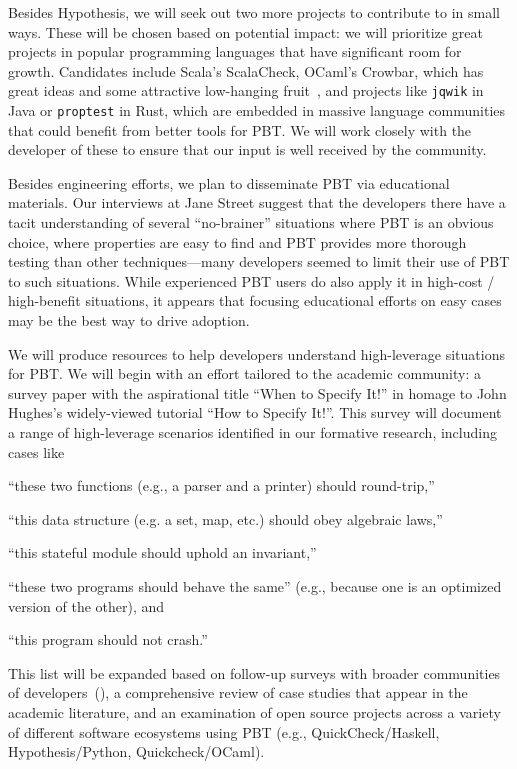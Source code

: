 Besides Hypothesis, we will seek out two more projects to contribute to in small
ways. These
will be chosen based on potential impact: we will prioritize great
projects in popular programming languages that have significant room
for growth. Candidates include
Scala's ScalaCheck,
OCaml's Crowbar, which has great ideas and
some attractive low-hanging fruit~\cite{noauthor_shrinking_nodate}, and projects like
\lstinline{jqwik} in Java or \lstinline{proptest} in Rust, which are
embedded in massive language
communities that could benefit from better tools for PBT.
We will work closely with the
developer of these to ensure that our input is well received by the community.

%
Besides engineering efforts, we plan to disseminate PBT via
educational materials.
Our interviews at Jane Street suggest that the developers there
have a tacit
understanding of several ``no-brainer'' situations where PBT is an obvious
choice, where properties are easy to find and PBT provides
more thorough testing than other techniques---many developers
seemed to limit their use of PBT to such situations.
While experienced PBT users do also apply it in
high-cost / high-benefit situations, it appears that
focusing educational efforts on easy cases may be the best way to
drive adoption.

We will produce resources to help developers understand
high-leverage situations for PBT. We will begin with an effort
tailored to the academic community: a survey paper with the
aspirational title ``When to Specify It!'' in homage to John Hughes's
widely-viewed tutorial ``How to Specify It!''. This survey will
document a  range of high-leverage scenarios identified in our formative
research, including cases like
\begin{enumerate*}[label=(\arabic{enumi})]
\item ``these two functions (e.g., a parser and a printer) should round-trip,''
\item ``this data structure (e.g. a set, map, etc.) should obey algebraic laws,''
\item ``this stateful module should uphold an invariant,''
\item ``these two programs should behave the same'' (e.g., because one
is an optimized version of the other),
and
\item ``this program should not crash.''
\end{enumerate*}
This list will be expanded based on follow-up surveys with broader
communities of developers~(), a comprehensive
review of case studies that appear in
the academic literature, and an examination of open source projects across a
variety of different software ecosystems using PBT (e.g.,
QuickCheck/Haskell, Hypothesis/Python, Quickcheck/OCaml).


